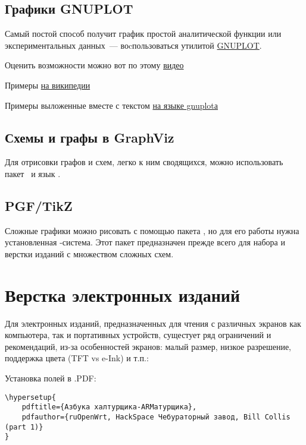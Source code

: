 \subsection{Графики GNUPLOT}

Самый постой способ получит график простой аналитической функции или
экспериментальных данных\ --- воcпользоваться утилитой
\href{http://gnuplot.info/}{GNUPLOT}.

\bigskip
Оценить возможности можно вот по этому
\href{http://upload.wikimedia.org/wikipedia/commons/b/b2/Gnuplot.ogv}{видео}

\bigskip
Примеры
\href{http://commons.wikimedia.org/wiki/Category:Gnuplot\_diagrams}{на
википедии}

\bigskip
Примеры выложенные вместе с текстом
\href{http://commons.wikimedia.org/wiki/Category:Images\_with\_Gnuplot\_source\_code}{на
языке gnuplotа}

\subsection{Схемы и графы в GraphViz}

Для отрисовки графов и схем, легко к ним сводящихся, можно использовать пакет
\ и язык . 

\subsection{PGF/TikZ}

Сложные графики можно рисовать с помощью пакета , но для его
работы нужна установленная \latex-система. Этот пакет предназначен прежде всего
для набора и верстки изданий с множеством сложных схем.



\section{Верстка электронных изданий}

Для электронных изданий, предназначенных для чтения с различных экранов как
компьютера, так и портативных устройств, сущестует ряд ограничений и
рекомендаций, из-за особенностей экранов: малый размер, низкое разрешение,
поддержка цвета (TFT vs e-Ink) и т.п.: \cite{ebooktex}

\bigskip
Установка полей в .PDF:

\nopagebreak
\begin{verbatim}
\hypersetup{
	pdftitle={Азбука халтурщика-ARMатурщика},
	pdfauthor={ruOpenWrt, HackSpace Чебураторный завод, Bill Collis (part 1)}
}
\end{verbatim}
